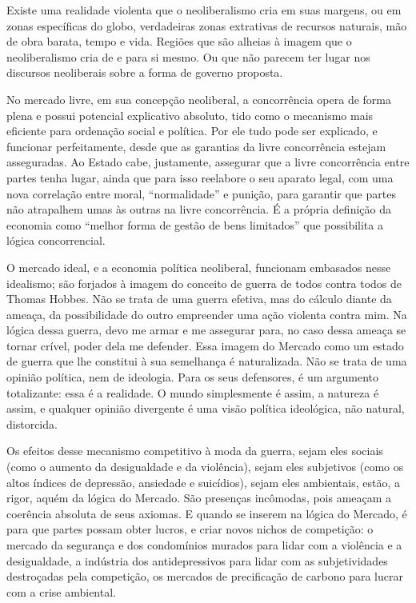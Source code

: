 Existe uma realidade violenta que o neoliberalismo cria em suas margens,
ou em zonas específicas do globo, verdadeiras zonas extrativas de
recursos naturais, mão de obra barata, tempo e vida. Regiões que são
alheias à imagem que o neoliberalismo cria de e para si mesmo. Ou que não
parecem ter lugar nos discursos neoliberais sobre a forma de governo
proposta.

\asterisc

No mercado livre, em sua concepção neoliberal, a concorrência opera de
forma plena e possui potencial explicativo absoluto, tido como o
mecanismo mais eficiente para ordenação social e política. Por ele tudo
pode ser explicado, e funcionar perfeitamente, desde que as garantias da
livre concorrência estejam asseguradas. Ao Estado cabe, justamente,
assegurar que a livre concorrência entre partes tenha lugar, ainda que
para isso reelabore o seu aparato legal, com uma nova
correlação entre moral, ``normalidade'' e punição, para garantir que
partes não atrapalhem umas às outras na livre concorrência. É a própria
definição da economia como ``melhor forma de gestão de bens limitados''
que possibilita a lógica concorrencial.

O mercado ideal, e a economia política neoliberal, funcionam embasados
nesse idealismo; são forjados à imagem do conceito de guerra de todos
contra todos de Thomas Hobbes. Não se trata de uma guerra efetiva, mas
do cálculo diante da ameaça, da possibilidade do outro empreender uma
ação violenta contra mim. Na lógica dessa guerra, devo me armar e me
assegurar para, no caso dessa ameaça se tornar crível, poder dela me
defender. Essa imagem do Mercado como um estado de guerra que lhe
constitui à sua semelhança é naturalizada. Não se trata de uma opinião
política, nem de ideologia. Para os seus defensores, é um argumento
totalizante: essa é a realidade. O mundo simplesmente é assim, a
natureza é assim, e qualquer opinião divergente é uma visão política
ideológica, não natural, distorcida.

Os efeitos desse mecanismo competitivo à moda da guerra, sejam eles
sociais (como o aumento da desigualdade e da violência), sejam eles
subjetivos (como os altos índices de depressão, ansiedade e suicídios),
sejam eles ambientais, estão, a rigor, aquém da lógica do Mercado. São
presenças incômodas, pois ameaçam a coerência absoluta de seus axiomas.
E quando se inserem na lógica do Mercado, é para que partes possam obter
lucros, e criar novos nichos de competição: o mercado da segurança e dos
condomínios murados para lidar com a violência e a desigualdade, a
indústria dos antidepressivos para lidar com as subjetividades
destroçadas pela competição, os mercados de precificação de carbono para
lucrar com a crise ambiental.

